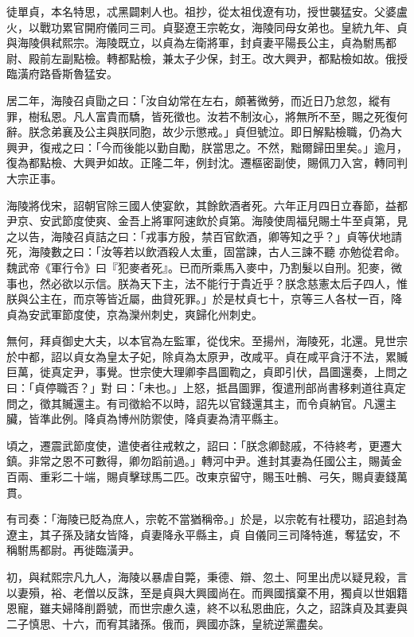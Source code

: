 \begin{pinyinscope}
 徒單貞，本名特思，忒黑闢剌人也。祖抄，從太祖伐遼有功，授世襲猛安。父婆盧火，以戰功累官開府儀同三司。貞娶遼王宗乾女，海陵同母女弟也。皇統九年、貞與海陵俱弒熙宗。海陵既立，以貞為左衛將軍，封貞妻平陽長公主，貞為駙馬都尉、殿前左副點檢。轉都點檢，兼太子少保，封王。改大興尹，都點檢如故。俄授臨潢府路昏斯魯猛安。



 居二年，海陵召貞勖之曰：「汝自幼常在左右，頗著微勞，而近日乃怠忽，縱有罪，樹私恩。凡人富貴而驕，皆死徵也。汝若不制汝心，將無所不至，賜之死復何
 辭。朕念弟襄及公主與朕同胞，故少示懲戒。」貞但號泣。即日解點檢職，仍為大興尹，復戒之曰：「今而後能以勤自勵，朕當思之。不然，黜爾歸田里矣。」逾月，復為都點檢、大興尹如故。正隆二年，例封沈。遷樞密副使，賜佩刀入宮，轉同判大宗正事。



 海陵將伐宋，詔朝官除三國人使宴飲，其餘飲酒者死。六年正月四日立春節，益都尹京、安武節度使爽、金吾上將軍阿速飲於貞第。海陵使周福兒賜土牛至貞第，見之以告，海陵召貞詰之曰：「戎事方殷，禁百官飲酒，卿等知之乎？」貞等伏地請死，海陵數之曰：「汝等若以飲酒殺人太重，固當諫，古人三諫不聽
 亦勉從君命。魏武帝《軍行令》曰『犯麥者死』。已而所乘馬入麥中，乃割髮以自刑。犯麥，微事也，然必欲以示信。朕為天下主，法不能行于貴近乎？朕念慈憲太后子四人，惟朕與公主在，而京等皆近屬，曲貸死罪。」於是杖貞七十，京等三人各杖一百，降貞為安武軍節度使，京為灤州刺史，爽歸化州刺史。



 無何，拜貞御史大夫，以本官為左監軍，從伐宋。至揚州，海陵死，北還。見世宗於中都，詔以貞女為皇太子妃，除貞為太原尹，改咸平。貞在咸平貪汙不法，累贓巨萬，徙真定尹，事覺。世宗使大理卿李昌圖鞫之，貞即引伏，昌圖還奏，上問之曰：「貞停職否？」對
 曰：「未也。」上怒，抵昌圖罪，復遣刑部尚書移剌道往真定問之，徵其贓還主。有司徵給不以時，詔先以官錢還其主，而令貞納官。凡還主臟，皆準此例。降貞為博州防禦使，降貞妻為清平縣主。



 頃之，遷震武節度使，遣使者往戒敕之，詔曰：「朕念卿懿戚，不待終考，更遷大鎮。非常之恩不可數得，卿勿蹈前過。」轉河中尹。進封其妻為任國公主，賜黃金百兩、重彩二十端，賜貞擊球馬二匹。改東京留守，賜玉吐鶻、弓矢，賜貞妻錢萬貫。



 有司奏：「海陵已貶為庶人，宗乾不當猶稱帝。」於是，以宗乾有社稷功，詔追封為遼主，其子孫及諸女皆降，貞妻降永平縣主，貞
 自儀同三司降特進，奪猛安，不稱駙馬都尉。再徙臨潢尹。



 初，與弒熙宗凡九人，海陵以暴虐自斃，秉德、辯、忽土、阿里出虎以疑見殺，言以妻殞，裕、老僧以反誅，至是貞與大興國尚在。而興國擯棄不用，獨貞以世姻籍恩寵，雖夫婦降削爵號，而世宗慮久遠，終不以私恩曲庇，久之，詔誅貞及其妻與二子慎思、十六，而宥其諸孫。俄而，興國亦誅，皇統逆黨盡矣。




\end{pinyinscope}
